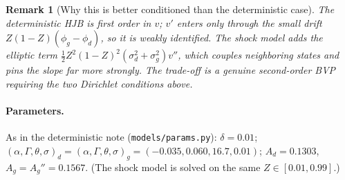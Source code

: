 \documentclass[11pt]{article}
\newtheorem{remark}{Remark}
\begin{document}
\begin{remark}[Why this is better conditioned than the deterministic case]
The deterministic HJB is first order in $v$; $v'$ enters only through the small
drift $Z(1-Z)(\phi_g-\phi_d)$, so it is weakly identified. The shock model adds the
\emph{elliptic} term $\tfrac12Z^2(1-Z)^2(\sigma_d^2+\sigma_g^2)v''$, which couples
neighboring states and pins the slope far more strongly. The trade-off is a genuine
second-order BVP requiring the two Dirichlet conditions above.
\end{remark}

\paragraph{Parameters.} As in the deterministic note (\texttt{models/params.py}):
$\delta=0.01$; $(\alpha,\Gamma,\theta,\sigma)_d=(\alpha,\Gamma,\theta,\sigma)_g
=(-0.035,0.060,16.7,0.01)$; $A_d=0.1303$, $A_g=A_g''=0.1567$. (The shock model is
solved on the same $Z\in[0.01,0.99]$.)
\end{document}
